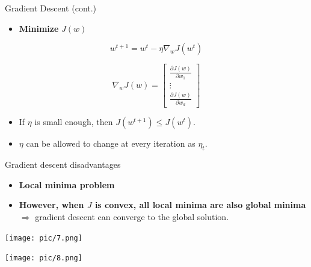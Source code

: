 \documentclass[serif, aspectratio=169]{beamer}
\begin{document}
\begin{frame}{Gradient Descent (cont.)}

    \begin{itemize}
        \item \textbf{Minimize} \( J(w) \)
    \end{itemize}

    \[
    w^{t+1} = w^t - \eta \nabla_w J(w^t)
    \]

    \[
    \nabla_w J(w) =
    \begin{bmatrix}
        \frac{\partial J(w)}{\partial w_1} \\
        \vdots \\
        \frac{\partial J(w)}{\partial w_d}
    \end{bmatrix}
    \]

    \begin{itemize}
        \item If \( \eta \) is small enough, then \( J(w^{t+1}) \leq J(w^t) \).
        \item \( \eta \) can be allowed to change at every iteration as \( \eta_t \).
    \end{itemize}

\end{frame}

\begin{frame}{Gradient descent disadvantages}

    \begin{itemize}
        \item \textbf{Local minima problem}

        \item \textbf{However, when \( J \) is convex, all local minima are also global minima} \(\Rightarrow\) gradient descent can converge to the global solution.
    \end{itemize}

    \begin{minipage}{0.48\textwidth}
        \centering
        \texttt{[image: pic/7.png]}
    \end{minipage}%
    \begin{minipage}{0.48\textwidth}
        \centering
        \texttt{[image: pic/8.png]}
    \end{minipage}
    \vfill

\end{frame}
\end{document}
